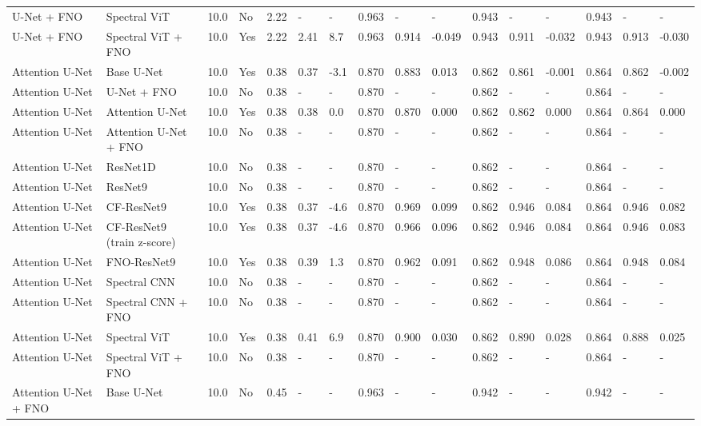 \begin{longtable}{llllllllllllllll}
U-Net + FNO & Spectral ViT & 10.0 & No & 2.22 & - & - & 0.963 & - & - & 0.943 & - & - & 0.943 & - & - \\
U-Net + FNO & Spectral ViT + FNO & 10.0 & Yes & 2.22 & 2.41 & 8.7 & 0.963 & 0.914 & -0.049 & 0.943 & 0.911 & -0.032 & 0.943 & 0.913 & -0.030 \\
Attention U-Net & Base U-Net & 10.0 & Yes & 0.38 & 0.37 & -3.1 & 0.870 & 0.883 & 0.013 & 0.862 & 0.861 & -0.001 & 0.864 & 0.862 & -0.002 \\
Attention U-Net & U-Net + FNO & 10.0 & No & 0.38 & - & - & 0.870 & - & - & 0.862 & - & - & 0.864 & - & - \\
Attention U-Net & Attention U-Net & 10.0 & Yes & 0.38 & 0.38 & 0.0 & 0.870 & 0.870 & 0.000 & 0.862 & 0.862 & 0.000 & 0.864 & 0.864 & 0.000 \\
Attention U-Net & Attention U-Net + FNO & 10.0 & No & 0.38 & - & - & 0.870 & - & - & 0.862 & - & - & 0.864 & - & - \\
Attention U-Net & ResNet1D & 10.0 & No & 0.38 & - & - & 0.870 & - & - & 0.862 & - & - & 0.864 & - & - \\
Attention U-Net & ResNet9 & 10.0 & No & 0.38 & - & - & 0.870 & - & - & 0.862 & - & - & 0.864 & - & - \\
Attention U-Net & CF-ResNet9 & 10.0 & Yes & 0.38 & 0.37 & -4.6 & 0.870 & 0.969 & 0.099 & 0.862 & 0.946 & 0.084 & 0.864 & 0.946 & 0.082 \\
Attention U-Net & CF-ResNet9 (train z-score) & 10.0 & Yes & 0.38 & 0.37 & -4.6 & 0.870 & 0.966 & 0.096 & 0.862 & 0.946 & 0.084 & 0.864 & 0.946 & 0.083 \\
Attention U-Net & FNO-ResNet9 & 10.0 & Yes & 0.38 & 0.39 & 1.3 & 0.870 & 0.962 & 0.091 & 0.862 & 0.948 & 0.086 & 0.864 & 0.948 & 0.084 \\
Attention U-Net & Spectral CNN & 10.0 & No & 0.38 & - & - & 0.870 & - & - & 0.862 & - & - & 0.864 & - & - \\
Attention U-Net & Spectral CNN + FNO & 10.0 & No & 0.38 & - & - & 0.870 & - & - & 0.862 & - & - & 0.864 & - & - \\
Attention U-Net & Spectral ViT & 10.0 & Yes & 0.38 & 0.41 & 6.9 & 0.870 & 0.900 & 0.030 & 0.862 & 0.890 & 0.028 & 0.864 & 0.888 & 0.025 \\
Attention U-Net & Spectral ViT + FNO & 10.0 & No & 0.38 & - & - & 0.870 & - & - & 0.862 & - & - & 0.864 & - & - \\
Attention U-Net + FNO & Base U-Net & 10.0 & No & 0.45 & - & - & 0.963 & - & - & 0.942 & - & - & 0.942 & - & - \\

\end{longtable}
